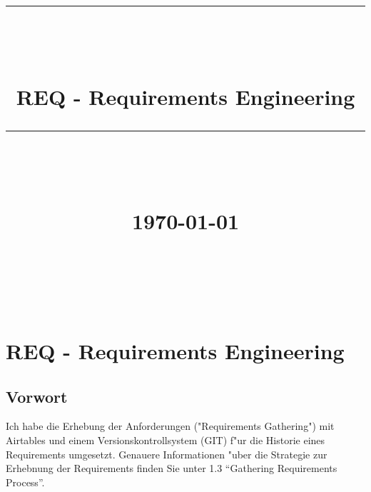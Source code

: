 \documentclass[12pt]{article}
\newcommand{\HRule}[1]{\rule{\linewidth}{#1}}
\begin{document}
\hypersetup{
    citecolor=black,
    filecolor=black,
    linkcolor=black,
    urlcolor=black
}


\title{ \normalsize
		\HRule{0.5pt} \\
		\LARGE \textbf{\uppercase{\newCommandDiscipline}} \\
    \smallbreak
    \small\textbf{{REQ - Requirements Engineering}}\\
		\HRule{2pt} \\ [0.5cm]
    \small\textbf{{\newCommandTerm}}\\
    [0.5cm]
    \normalsize \today \vspace*{10\baselineskip}}

\date{}



\author{
    \newCommandName \\
		\newCommandMatriculationNumber \\
		\newCommandUniversity \\
		\newCommandFaculty
}


\maketitle
\thispagestyle{empty}

\newpage
\pagestyle{myfancy}
\tableofcontents
\newpage

\sectionfont{\scshape}

\section{REQ - Requirements Engineering}

\subsection{Vorwort}

Ich habe die Erhebung der Anforderungen ("Requirements Gathering") mit Airtables und einem Versionskontrollsystem (GIT) f"ur die Historie eines Requirements umgesetzt.
Genauere Informationen "uber die Strategie zur Erhebnung der Requirements finden Sie unter 1.3 ``Gathering Requirements Process''.
\end{document}
